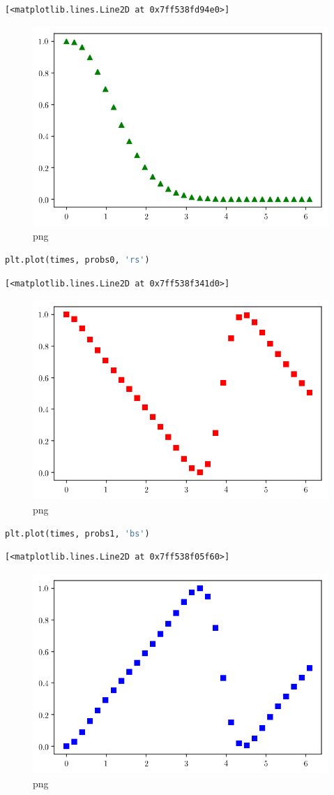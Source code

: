 \begin{lstlisting}
[<matplotlib.lines.Line2D at 0x7ff538fd94e0>]
\end{lstlisting}

\begin{figure}
\centering
\includegraphics[width=0.6\linewidth]{output_89_1.png}
\caption[]{png}
\end{figure}

\begin{lstlisting}[language=Python]
plt.plot(times, probs0, 'rs')
\end{lstlisting}

\begin{lstlisting}
[<matplotlib.lines.Line2D at 0x7ff538f341d0>]
\end{lstlisting}

\begin{figure}
\centering
\includegraphics[width=0.6\linewidth]{output_90_1.png}
\caption[]{png}
\end{figure}

\begin{lstlisting}[language=Python]
plt.plot(times, probs1, 'bs')
\end{lstlisting}

\begin{lstlisting}
[<matplotlib.lines.Line2D at 0x7ff538f05f60>]
\end{lstlisting}

\begin{figure}
\centering
\includegraphics[width=0.6\linewidth]{output_91_1.png}
\caption[]{png}
\end{figure}

